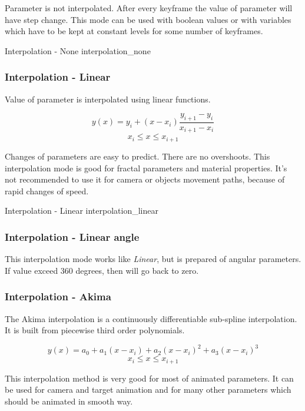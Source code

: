 Parameter is not interpolated. After every keyframe the value of parameter will
have step change. This mode can be used with boolean values or with variables
which have to be kept at constant levels for some number of keyframes.

{Interpolation - None}
{interpolation_none}

\subsubsection{Interpolation - Linear}\label{interpolation-linear}

Value of parameter is interpolated using linear functions.

\[ y(x) = y_i + (x - x_i) \frac{y_{i+1} - y_i}{x_{i+1} - x_i}\] \[x_i  \leq x
\leq x_{i+1}\]

Changes of parameters are easy to predict. There are no overshoots. This
interpolation mode is good for fractal parameters and material properties. It's
not recommended to use it for camera or objects movement paths, because of rapid
changes of speed.

{Interpolation - Linear}
{interpolation_linear}

\subsubsection{Interpolation - Linear angle}\label{interpolation-linear-angle}

This interpolation mode works like \emph{Linear}, but is prepared of angular
parameters. If value exceed 360 degrees, then will go back to zero.

\subsubsection{Interpolation - Akima}\label{interpolation-akima}

The Akima interpolation is a continuously differentiable sub-spline
interpolation. It is built from piecewise third order polynomials.

\[ y(x) = a_0 + a_1 (x - x_i) + a_2 (x - x_i)^2 + a_3 (x - x_i)^3\] \[x_i  \leq
x \leq x_{i+1}\]

This interpolation method is very good for most of animated parameters. It can
be used for camera and target animation and for many other parameters which
should be animated in smooth way.

